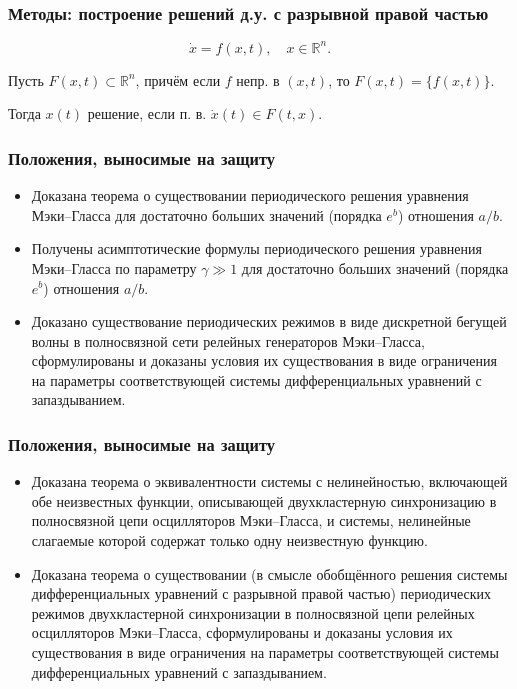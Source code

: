 \begin{frame}
	\frametitle{Методы: построение решений д.у. с разрывной правой частью}
	
	\begin{equation*}
		\dot{x} = f(x, t), \quad x \in \mathbb{R}^n.
	\end{equation*}
	
	Пусть $F(x, t) \subset \mathbb{R}^n$, причём если $f$ непр. в $(x, t)$, то $F(x, t) = \{f(x, t)\}$.
	
	Тогда $x(t)$ решение, если п. в. $\dot{x}(t) \in F(t, x)$.
\end{frame}


\begin{frame}
    \frametitle{Положения, выносимые на защиту}

    \begin{itemize}
    	\item Доказана теорема о существовании периодического решения уравнения Мэки--Гласса для достаточно больших значений (порядка $e^b$) отношения $a / b$.
    	\item Получены асимптотические формулы периодического решения уравнения Мэки--Гласса по параметру $\gamma \gg 1$ для достаточно больших значений (порядка $e^b$) отношения $a / b$.
    	\item Доказано существование периодических режимов в виде дискретной бегущей волны в полносвязной сети релейных генераторов Мэки--Гласса, сформулированы и доказаны условия их существования в виде ограничения на параметры соответствующей системы дифференциальных уравнений с запаздыванием.
    \end{itemize}
\end{frame}

\begin{frame}
	\frametitle{Положения, выносимые на защиту}
	
	\begin{itemize}
		\item Доказана теорема о эквивалентности системы с нелинейностью, включающей обе неизвестных функции, описывающей двухкластерную синхронизацию в полносвязной цепи осцилляторов Мэки--Гласса, и системы, нелинейные слагаемые которой содержат только одну неизвестную функцию.
		\item Доказана теорема о существовании (в смысле обобщённого решения системы дифференциальных уравнений с разрывной правой частью) периодических режимов двухкластерной синхронизации в полносвязной цепи релейных осцилляторов Мэки--Гласса, сформулированы и доказаны условия их существования в виде ограничения на параметры соответствующей системы дифференциальных уравнений с запаздыванием.
	\end{itemize}
\end{frame}

